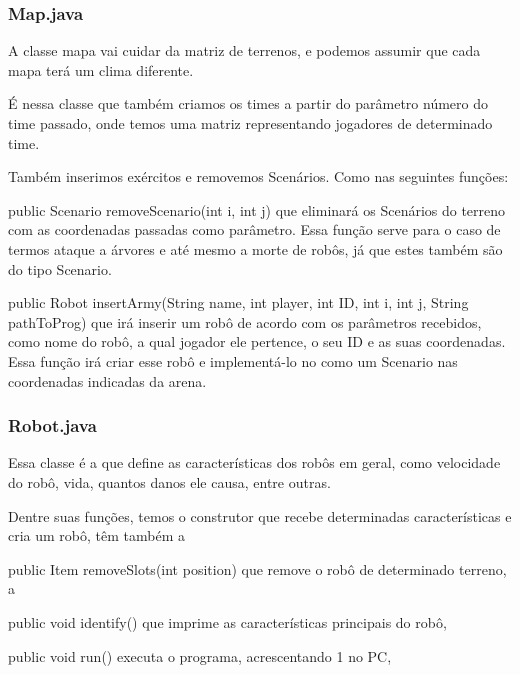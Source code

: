 \documentclass[a4paper]{article}
\begin{document}
{{{{{{{{{{{{{{{{{{		\subsubsection{ Map.java }
		    A classe mapa vai cuidar da matriz de terrenos, e 
		    podemos assumir que cada mapa terá um clima diferente.
		    
		    É nessa classe que também criamos os times a partir
		    do parâmetro número do time passado, onde temos uma 
		    matriz representando jogadores de determinado time.
		    
		    Também inserimos exércitos e removemos Scenários.
		    Como nas seguintes funções:
		    
		    {\textcolor{NavyBlue}{public Scenario
		    removeScenario(int i, int j)}
		    que eliminará os Scenários do terreno com as coordenadas
		    passadas como parâmetro. Essa função serve para o caso 
		    de termos ataque a árvores e até mesmo a morte de robôs,
		    já que estes também são do tipo Scenario.
		    
		    {\textcolor{NavyBlue}{public Robot insertArmy(String
		    name, int player, int ID, int i, int j, String pathToProg)}
            que irá inserir um robô de acordo com os parâmetros
            recebidos, como nome do robô, a qual jogador ele pertence,
            o seu ID e as suas coordenadas.
            Essa função irá criar esse robô e implementá-lo no como 
            um Scenario nas coordenadas indicadas da arena.

\newpage %

		    
		\subsubsection{ Robot.java }
			Essa classe é a que define as características dos robôs
			em geral, como velocidade do robô, vida, quantos danos ele
			causa, entre outras.
			
			Dentre suas funções, temos o construtor que recebe determinadas
			características e cria um robô, têm também a
			 
			{\textcolor{NavyBlue}{public Item removeSlots(int position)}
			que remove o robô de determinado terreno, a
			
			{\textcolor{NavyBlue}{public void identify()}
			que imprime as características principais do robô,
			
			{\textcolor{NavyBlue}{public void run()}
			executa o programa, acrescentando 1 no PC,
			
}}}}}}}}}}}}}}}}}}}}}}}
\end{document}
